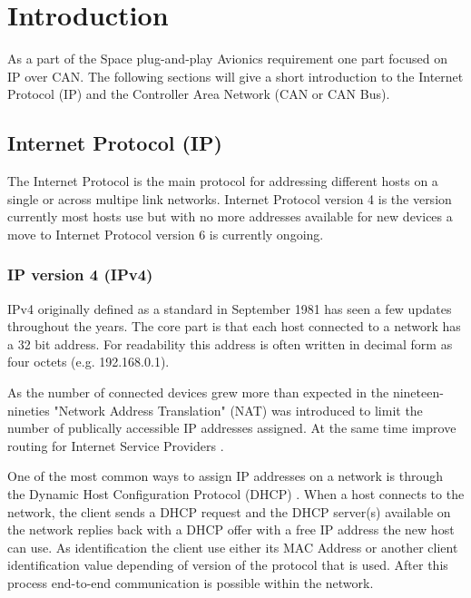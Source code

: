 \section{Introduction}\label{sec:introduction}
As a part of the Space plug-and-play Avionics requirement one part
focused on IP over CAN. The following sections will give a short
introduction to the Internet Protocol (IP) and the Controller Area Network
(CAN or CAN Bus).

\subsection{Internet Protocol (IP)}
The Internet Protocol is the main protocol for addressing different hosts on a
single or across multipe link networks. Internet Protocol version 4 is the
version currently most hosts use but with no more addresses available
for new devices a move to Internet Protocol version 6 is currently ongoing.

\subsubsection{IP version 4 (IPv4)}\label{introduction:ipv4}
IPv4 originally defined as a standard in September 1981 \cite{web:rfc791} has
seen a few updates throughout the years. The core part is that each host
connected to a network has a 32 bit address. For readability this address
is often written in decimal form as four octets (e.g. 192.168.0.1).

As the number of connected devices grew more than expected in the nineteen-nineties
"Network Address Translation" (NAT) was introduced to limit the number of
publically accessible IP addresses assigned. At the same time improve routing for Internet
Service Providers \cite{web:rfc1631, web:rfc1918, web:rfc3022}.

One of the most common ways to assign IP addresses on a network is through the
Dynamic Host Configuration Protocol (DHCP) \cite{web:rfc2131, web:rfc2132, web:rfc4361}.
When a host connects to the network, the client sends a DHCP request and the DHCP
server(s) available on the network replies back with a DHCP offer with a free
IP address the new host can use. As identification the client use either its
MAC Address or another client identification value depending of version of the
protocol that is used. After this process end-to-end communication is possible
within the network.

